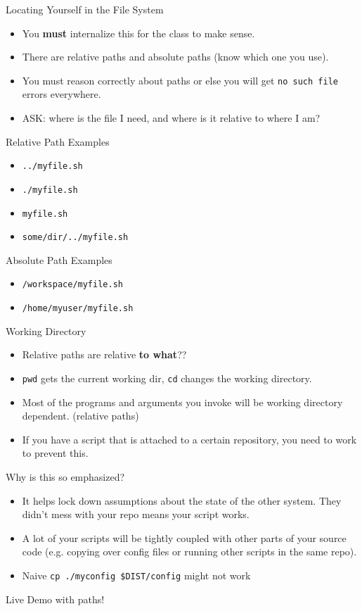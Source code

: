 \documentclass{../lecture}
\begin{document}
\begin{frame}{Locating Yourself in the File System}
  \begin{itemize}
    \item You \textbf{must} internalize this for the class to make sense.
    \item There are relative paths and absolute paths (know which one you use).
    \item You must reason correctly about paths or else you will get \texttt{no
      such file} errors everywhere.
    \item ASK: where is the file I need, and where is it relative to where I am?
  \end{itemize}
  \begin{block}{Relative Path Examples}
    \begin{itemize}
      \item \texttt{../myfile.sh}
      \item \texttt{./myfile.sh}
      \item \texttt{myfile.sh}
      \item \texttt{some/dir/../myfile.sh}
    \end{itemize}
  \end{block}
  \begin{block}{Absolute Path Examples}
    \begin{itemize}
      \item \texttt{/workspace/myfile.sh}
      \item \texttt{/home/myuser/myfile.sh}
    \end{itemize}
  \end{block}
\end{frame}

\begin{frame}[fragile]{Working Directory}
  \begin{itemize}
    \item Relative paths are relative \textbf{to what}??
    \item \texttt{pwd} gets the current working dir, \texttt{cd} changes the
      working directory.
    \item Most of the programs and arguments you invoke will be working
      directory dependent. (relative paths)
    \item If you have a  script that is attached to a certain repository, you
      need to work to prevent this.
  \end{itemize}
  Why is this so emphasized?
  \begin{itemize}
    \item It helps lock down assumptions about the state of the other system.
      They didn't mess with your repo means your script works.
    \item A lot of your scripts will be tightly coupled with other parts of your
      source code (e.g. copying over config files or running other scripts in
      the same repo).
    \item Naive \texttt{cp ./myconfig \$DIST/config} might not work
  \end{itemize}
  Live Demo with paths!
\end{frame}
\end{document}
